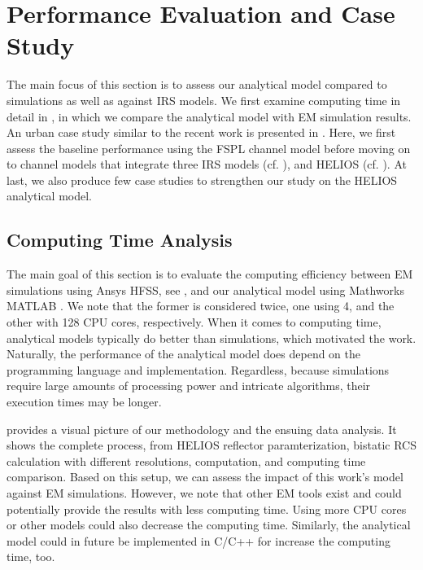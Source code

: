 \chapter{Performance Evaluation and Case Study}
\label{Performance Evaluation and Case Study}
The main focus of this section is to assess our analytical model compared to simulations as well as against IRS models.
We first examine computing time in detail in , in which we compare the analytical model with EM simulation results. An urban case study similar to the recent work \cite{Helios} is presented in . Here, we first assess the baseline performance using the FSPL channel model before moving on to channel models that integrate three IRS models (cf. ), and HELIOS (cf. ). At last, we also produce few case studies to strengthen our study on the HELIOS analytical model.
\section{Computing Time Analysis} \label{Computing Time Analysis}
The main goal of this section is to evaluate the computing efficiency between EM simulations using Ansys HFSS, see , and our analytical model using Mathworks MATLAB \cite{Helios}. We note that the former is considered twice, one using \num{4}, and the other with \num{128} CPU cores, respectively. When it comes to computing time, analytical models typically do better than simulations, which motivated the work. Naturally, the performance of the analytical model does depend on the programming language and implementation. Regardless, because simulations require large amounts of processing power and intricate algorithms, their execution times may be longer.

 provides a visual picture of our methodology and the ensuing data analysis. It shows the complete process, from HELIOS reflector paramterization, bistatic RCS calculation with different resolutions, computation, and computing time comparison. Based on this setup, we can assess the impact of this work's model against EM simulations. However, we note that other EM tools exist and could potentially provide the results with less computing time. Using more CPU cores or other models could also decrease the computing time. Similarly, the analytical model could in future be implemented in C/C++ for increase the computing time, too.

